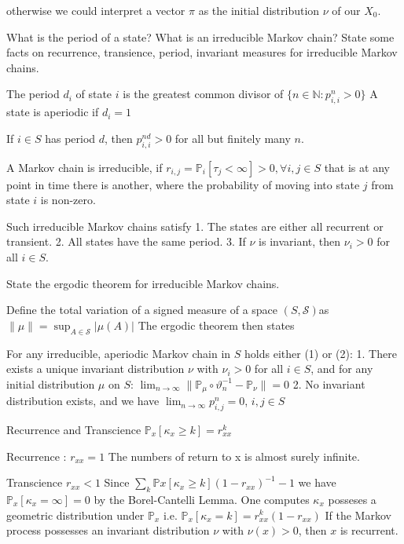 otherwise we could interpret a vector \( \pi \) as the initial distribution \( \nu \)
of our \( X_0 \).

What is the period of a state? What is an irreducible Markov chain? State some
facts on recurrence, transience, period, invariant measures for irreducible Markov
chains.

The period \( d_i \) of state \( i \) is the greatest common divisor of \( \{n \in \mathbb{N} : p^n_{i,i} > 0\} \)
A state is aperiodic if \( d_i = 1 \)

If \( i \in S \) has period \( d \), then \( p_{i,i}^{nd} > 0\) for all but finitely many \( n \).

A Markov chain is irreducible, if
\( r_{i,j} = \mathbb{P}_i[\tau_j < \infty] > 0, \forall i, j \in S \)
that is at any point in time there is another, where the probability of moving into state 
\( j \) from state \( i \) is non-zero.

Such irreducible Markov chains satisfy
1. The states are either all recurrent or transient.
2. All states have the same period.
3. If \( \nu \) is invariant, then \( \nu_i > 0 \) for all \( i \in S \).

State the ergodic theorem for irreducible Markov chains.

Define the total variation of a signed measure of a space \( (S, \mathcal{S}) \)as \( \|\mu\| = \sup_{A \in \mathcal{S}} |\mu(A)| \) 
The ergodic theorem then states

For any irreducible, aperiodic Markov chain in \( S \) holds either (1) or (2):
1. There exists a unique invariant distribution \( \nu \) with \( \nu_i > 0 \) for all \( i \in S \), 
and for any initial distribution \( \mu \) on \( S \):
\( \lim_{n \to \infty} \|\mathbb{P}_\mu \circ \vartheta^{-1}_n - \mathbb{P}_\nu \| = 0\)
2. No invariant distribution exists, and we have
\( \lim_{n \to \infty} p^n_{i,j} = 0 \), \( i, j \in S \)


Recurrence and Transcience
\( \mathbb{P}_{x}[\kappa_x \geq k] = r_{x x}^k \)

Recurrence : \( r_{x x} = 1 \)
The numbers of return to x is almost surely infinite.

Transcience \( r_{x x} < 1\)
Since \( \sum_k \mathbb{P}x[\kappa_x \geq k] (1 - r_{x x})^{-1} - 1 \) we have \( \mathbb{P}_{x}[\kappa_x = \infty] = 0\)
by the Borel-Cantelli Lemma. One computes \( \kappa_x \) posseses a geometric distribution under \( \mathbb{P}_x \) i.e.
\( \mathbb{P}_x[\kappa_x = k] = r^k_{x x}(1 - r_{x x})\)
If the Markov process possesses an invariant distribution \( \nu \) with \( \nu(x) > 0 \), then \( x \) is recurrent.
    
